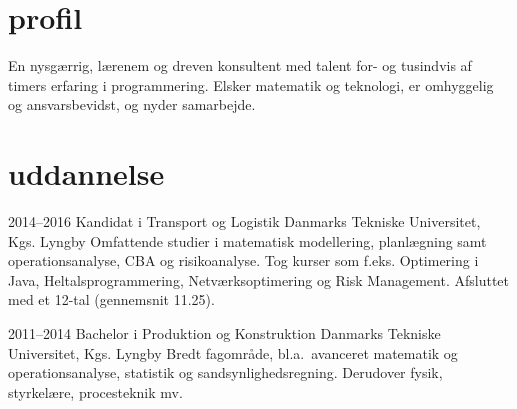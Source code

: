 \documentclass[]{../friggeri-cv} %
\begin{document}
\section{profil}
En nysgærrig, lærenem og dreven konsultent med talent for- og tusindvis af timers erfaring i programmering. Elsker matematik og teknologi, er omhyggelig og ansvarsbevidst, og nyder samarbejde. 
\section{uddannelse}
\begin{entrylist}

\entry
{2014--2016}
{Kandidat {\normalfont i Transport og Logistik}}
{Danmarks Tekniske Universitet, Kgs. Lyngby}
{Omfattende studier i matematisk modellering, planlægning samt operationsanalyse, CBA og risikoanalyse. Tog kurser som f.eks. Optimering i Java, Heltalsprogrammering, Netværksoptimering og Risk Management. Afsluttet med et 12-tal (gennemsnit 11.25).
}

\entry
{2011--2014}
{Bachelor {\normalfont i Produktion og Konstruktion}}
{Danmarks Tekniske Universitet, Kgs. Lyngby}
{Bredt fagområde, bl.a.\ avanceret matematik og operationsanalyse, statistik og sandsynlighedsregning. Derudover fysik, styrkelære, procesteknik mv.}


\end{entrylist}

\end{document}

